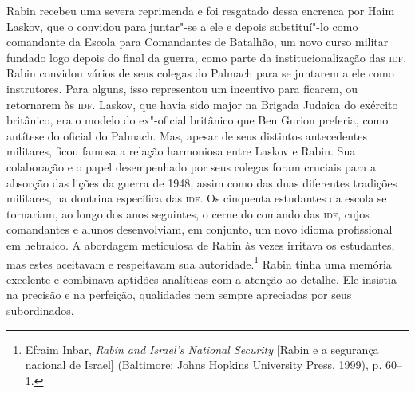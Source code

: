 Rabin recebeu uma severa reprimenda e foi resgatado dessa encrenca por
Haim Laskov, que o convidou para juntar"-se a ele e depois substituí"-lo
como comandante da Escola para Comandantes de Batalhão, um novo curso
militar fundado logo depois do final da guerra, como parte da
institucionalização das \textsc{idf}. Rabin convidou vários de seus colegas do
Palmach para se juntarem a ele como instrutores. Para alguns, isso representou
um incentivo para ficarem, ou retornarem às \textsc{idf}. Laskov, que havia sido
major na Brigada Judaica do exército britânico, era o modelo do
ex"-oficial britânico que Ben Gurion preferia, como antítese do oficial
do Palmach. Mas, apesar de seus distintos antecedentes militares, ficou
famosa a relação harmoniosa entre Laskov e Rabin. Sua colaboração e o
papel desempenhado por seus colegas foram cruciais para a absorção das
lições da guerra de 1948, assim como das duas diferentes tradições
militares, na doutrina específica das \textsc{idf}. Os cinquenta estudantes da
escola se tornariam, ao longo dos anos seguintes, o cerne do comando das
\textsc{idf}, cujos comandantes e alunos desenvolviam, em conjunto, um novo idioma
profissional em hebraico. A abordagem meticulosa de Rabin às vezes
irritava os estudantes, mas estes aceitavam e respeitavam sua
autoridade.\footnote{Efraim Inbar, \emph{Rabin and Israel's National Security} {[Rabin e a segurança nacional de Israel]} (Baltimore: Johns
Hopkins University Press, 1999), p. 60--1.} Rabin tinha uma memória excelente e combinava
aptidões analíticas com a atenção ao detalhe. Ele insistia na precisão e
na perfeição, qualidades nem sempre apreciadas por seus subordinados.

